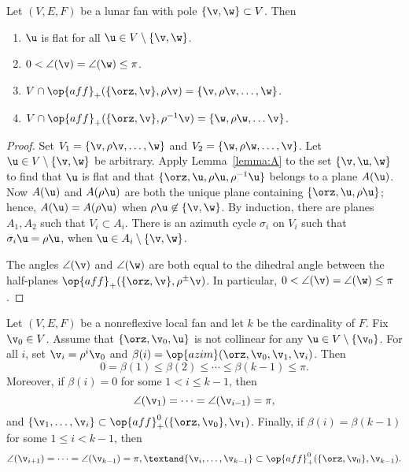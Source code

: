 \begin{lemma}
\label{lemma:lunar}
Let $(V,E,F)$ be a lunar fan with pole $\{\v,\w\}\subset V$.  
Then
\begin{enumerate}\wasitemize 
\item $\u$ is flat for all $\u\in V\setminus \{\v,\w\}$. \vspace{3pt}
\item $0< \angle(\v) = \angle(\w)\le \pi$. \vspace{3pt}
\item $V\cap \op{aff}_+(\{\orz,\v\},\rho \v) = \{\v,\rho \v,\ldots,
\w\}$. \vspace{3pt}
\item $V \cap \op{aff}_+(\{\orz,\v\},\rho^{-1} \v) = \{\w,\rho
\w,\ldots \v\}$. \vspace{3pt}
\end{enumerate}\wasitemize 
\end{lemma}

\begin{proof} Set $V_1 = \{\v,\rho \v,\ldots,\w\}$ and $V_2 =
\{\w,\rho \w,\ldots,\v\}$.  Let $\u\in V\setminus\{\v,\w\}$ be
arbitrary.  Apply Lemma~\ref{lemma:A} to the set $\{\v,\u,\w\}$ to
find that $\u$ is flat and that $\{\orz,\u,\rho \u,\rho^{-1} \u\}$
belongs to a plane $A(\u)$.  Now $A(\u)$ and $A(\rho \u)$ are both
the unique plane containing $\{\orz,\u,\rho \u\}$; hence, $A(\u) =
A(\rho \u)$ when $\rho \u\not\in \{\v,\w\}$.  By induction, there
are planes $A_1, A_2$ such that $V_i\subset A_i$.  There is an
azimuth cycle $\sigma_i$ on $V_i$ such that $\sigma_i \u = \rho \u$,
when $\u \in A_i\setminus \{\v,\w\}$.

The angles $\angle(\v)$ and $\angle(\w)$ are both equal to the
dihedral angle between the half-planes
$\op{aff}_+(\{\orz,\v\},\rho^{\pm}\v)$.  In particular,
$0<\angle(\v)=\angle(\w)\le\pi$.
\end{proof}




\begin{lemma}[monotonicity] 
\label{lemma:monotone}
Let $(V,E,F)$ be a nonreflexive local fan and let $k$ be the cardinality
of $F$.  Fix $\v_0\in V$.  Assume that
$\{\orz,\v_0,\u\}$ is not collinear for any $\u\in
V\setminus\{\v_0\}$.  For all $i$, set $\v_i = \rho^i \v_0$ and
$\beta(i) = \op{azim}(\orz,\v_0,\v_1,\v_i)$.  Then
\[ 0=\beta(1)\le \beta(2)\le \cdots\le
\beta(k-1)\le\pi.\] 
Moreover, if $\beta(i)=0$ for some $1<i \le k-1$, then
\[ 
\angle(\v_1) = \cdots = \angle(\v_{i-1}) = \pi,
\] 
and $\{\v_1,\ldots,\v_i\} \subset \op{aff}^0_+(\{\orz,\v_0\},\v_1)$.
Finally, if $\beta(i)=\beta(k-1)$ for some $1\le i<k-1$, then 
\[ 
\angle(\v_{i+1}) = \cdots = \angle(\v_{k-1}) = \pi,
\textand  \{\v_i,\ldots,\v_{k-1}\} \subset
\op{aff}^0_+(\{\orz,\v_0\},\v_{k-1}).
\]
\end{lemma}

